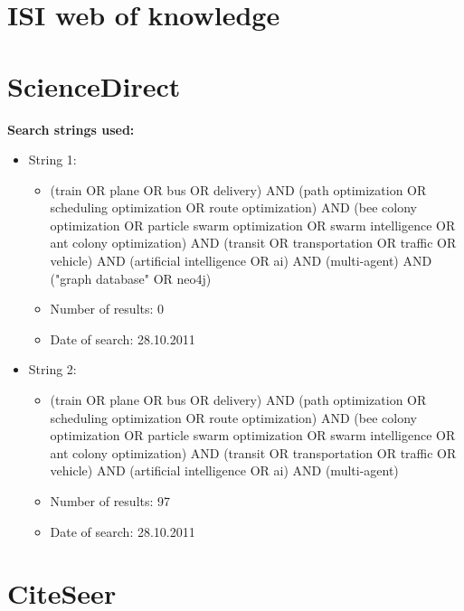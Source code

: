 \begin{itemize}
\end{itemize}

\section{ISI web of knowledge}


\section{ScienceDirect}
\textbf{Search strings used:}
\begin{itemize}
\item String 1:
\begin{itemize}
\item (train OR plane OR bus OR delivery) AND (path optimization OR scheduling optimization OR route optimization) AND (bee colony optimization OR particle swarm optimization OR swarm intelligence OR ant colony optimization) AND (transit OR transportation OR traffic OR vehicle) AND (artificial intelligence OR ai) AND (multi-agent) AND ("graph database" OR neo4j)
\item Number of results: 0
\item Date of search: 28.10.2011
\end{itemize}
\item String 2:
\begin{itemize}
\item (train OR plane OR bus OR delivery) AND (path optimization OR scheduling optimization OR route optimization) AND (bee colony optimization OR particle swarm optimization OR swarm intelligence OR ant colony optimization) AND (transit OR transportation OR traffic OR vehicle) AND (artificial intelligence OR ai) AND (multi-agent)
\item Number of results: 97
\item Date of search: 28.10.2011
\end{itemize}
\end{itemize}


\section{CiteSeer}


